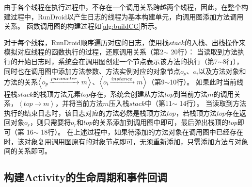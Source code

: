 
由于各个线程在执行过程中，不存在一个调用关系跨越两个线程，因此，在整个构建过程中，RunDroid以产生日志的线程为基本构建单元，向调用图添加方法调用关系。
函数调用图的构建过程如\autoref{alg:buildCG}所示。

对于每个线程，RunDroid顺序遍历对应的日志，使用栈$stack$的入栈、出栈操作来模拟对应线程的函数执行的过程，还原调用关系（第2$\sim$ 20行）：
当读取到方法执行的开始日志时，系统会在调用图创建一个节点表示该方法的执行（第7$\sim$8行），
同时也在调用图中添加方法参数、方法实例对应的对象节点$o_p$、$o_i$以及方法对象和方法的关系$ \left\langle  o_p \joinrel\xrightarrow{parameter}   m \right\rangle   $、$ \left\langle   o_i \joinrel\xrightarrow{instance}   m \right\rangle  $（第9$\sim$10行）。
如果此时当前线程栈$stack$的栈顶方法元素$top$存在，系统会创建从方法$top$到当前方法$m$的调用关系，$\left\langle top \to m \right \rangle  $，并将当前方法$m$压入栈$stack$中（第11$\sim$ 14行）。
当读取到方法执行的结束日志时，该日志对应的方法必然是栈顶方法$top$，若栈顶方法$top$存在返回对象$o_r$，则只需要将$o_r$和$top$的关系添加到调用图中即可，最后弹出栈顶的$top$即可（第 16$\sim$ 18行）。
在上述过程中，如果待添加的方法对象在调用图中已经存在时，该对象复用调用图原有的对象节点即可，无须重新添加，只需添加方法与对象间的关系即可。








\subsection{构建Activity的生命周期和事件回调}

